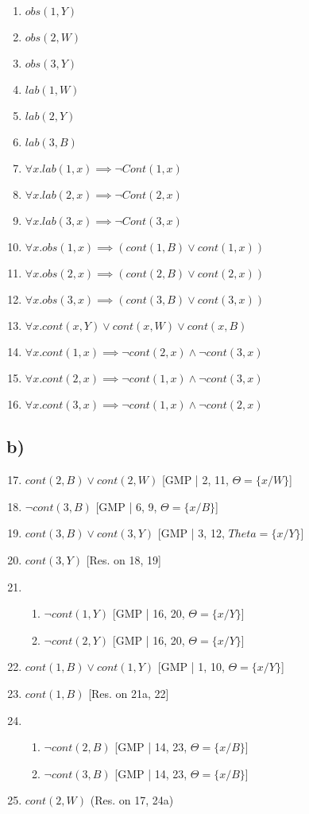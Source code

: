 \documentclass[22pt]{article}
\begin{document}
\begin{enumerate}
	\item $ obs(1, Y) $
	\item $ obs(2, W) $
	\item $ obs(3, Y) $
	\item $ lab(1, W) $
	\item $ lab(2, Y) $
	\item $ lab(3, B) $
	\item $\forall x. lab(1, x) \implies \neg Cont(1, x) $
	\item $\forall x. lab(2, x) \implies \neg Cont(2, x) $
	\item $\forall x. lab(3, x) \implies \neg Cont(3, x) $
	\item $\forall x. obs(1, x) \implies (cont(1, B) \lor cont(1, x))$
	\item $\forall x. obs(2, x) \implies (cont(2, B) \lor cont(2, x))$
	\item $\forall x. obs(3, x) \implies (cont(3, B) \lor cont(3, x))$
	\item $\forall x. cont(x, Y) \lor cont(x, W) \lor cont(x, B)$
	\item $\forall x. cont(1, x) \implies \neg cont(2, x) \land \neg cont(3, x) $
	\item $\forall x. cont(2, x) \implies \neg cont(1, x) \land \neg cont(3, x) $
	\item $\forall x. cont(3, x) \implies \neg cont(1, x) \land \neg cont(2, x) $
\end{enumerate}

\subsection*{b)}

\begin{enumerate}
\setcounter{enumi}{16}
	\item $cont(2, B) \lor cont(2, W)$ [GMP | 2, 11, $\Theta = \{x/W\}$]
	\item $\neg cont(3, B) $ [GMP | 6, 9, $\Theta=\{x/B\}$] 
	\item $cont(3, B) \lor cont(3, Y) $ [GMP | 3, 12, $Theta=\{x/Y\}$] 
	\item $cont(3, Y)$ [Res. on 18, 19]
	\item 
	\begin{enumerate}
		\item $\neg cont(1, Y)$ [GMP | 16, 20, $\Theta=\{x/Y\}$]
		\item $\neg cont(2, Y)$ [GMP | 16, 20, $\Theta=\{x/Y\}$] 
	\end{enumerate}
	\item $cont(1, B) \lor cont(1, Y)$ [GMP | 1, 10, $\Theta=\{x/Y\}$] 
	\item $cont(1, B)$ [Res. on 21a, 22]
	\item 
	\begin{enumerate}
		\item $\neg cont(2, B)$ [GMP | 14, 23, $\Theta=\{x/B\}$]
		\item $\neg cont(3, B)$ [GMP | 14, 23, $\Theta=\{x/B\}$]
	\end{enumerate}
	\item $cont (2, W)$ (Res. on 17, 24a)
\end{enumerate}
\end{document}
